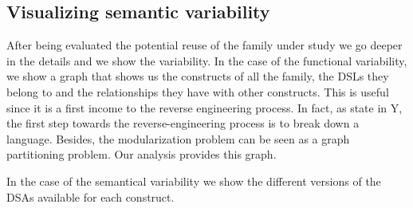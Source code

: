 \subsection{Visualizing semantic variability}

After being evaluated the potential reuse of the family under study we go deeper in the details and we show the variability. In the case of the functional variability, we show a graph that shows us the constructs of all the family, the DSLs they belong to and the relationships they have with other constructs. This is useful since it is a first income to the reverse engineering process. In fact, as state in Y, the first step towards the reverse-engineering process is to break down a language. Besides, the modularization problem can be seen as a graph partitioning problem. Our analysis provides this graph. 

In the case of the semantical variability we show the different versions of the DSAs available for each construct.


